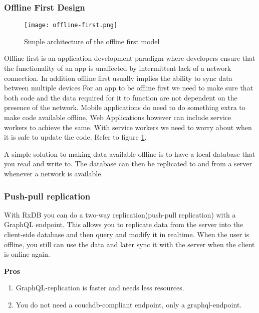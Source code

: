 \subsubsection{Offline First Design}

\begin{figure}[h!]
    \begin{center}
        \texttt{[image: offline-first.png]}
    \end{center}
    \caption{Simple architecture of the offline first model}
    \label{fig:offline-first}
\end{figure}

Offline first is an application development paradigm where developers ensure that the 
functionality of an app is unaffected by intermittent lack of a network connection. 
In addition offline first usually implies the ability to sync data between multiple devices
For an app to be offline first we need to make sure that both code and the data required 
for it to function are not dependent on the presence of the network.
Mobile applications do need to do something extra to make code available offline,
Web Applications however can include service workers to achieve the same.
With service workers we need to worry about when it is safe to update the code. 
Refer to figure \ref{fig:offline-first}.

A simple solution to making data available offline is to have a local database 
that you read and write to. The database can then be replicated to and from a 
server whenever a network is available.~\cite{HasuraOfflineFirst}


\subsubsection{Push-pull replication}

With RxDB you can do a two-way replication(push-pull replication) with a GraphQL endpoint. 
This allows you to replicate data from the server into the client-side database and then 
query and modify it in realtime.
When the user is offline, you still can use the data and later sync it with the server 
when the client is online again.

\textbf{Pros}
\begin{enumerate}
    \item GraphQL-replication is faster and needs less resources.
    \item You do not need a couchdb-compliant endpoint, only a graphql-endpoint.
\end{enumerate}

